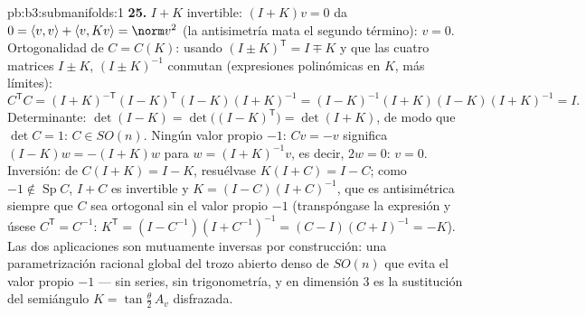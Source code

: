 \begin{solution}{pb:b3:submanifolds:1}
\textbf{25.} $I + K$ invertible: $(I + K)v = 0$ da $0 =
\langle v, v\rangle + \langle v, Kv\rangle = \norm v^2$ (la antisimetría
mata el segundo término): $v = 0$. Ortogonalidad de $C = C(K)$: usando
$(I \pm K)^{\mathsf T} = I \mp K$ y que las cuatro matrices $I \pm K$,
$(I \pm K)^{-1}$ conmutan (expresiones polinómicas en $K$, más límites):
\[
C^{\mathsf T}C = (I + K)^{-\mathsf T}(I - K)^{\mathsf T}
(I - K)(I + K)^{-1}
= (I - K)^{-1}(I + K)(I - K)(I + K)^{-1} = I .
\]
Determinante: $\det(I - K) = \det\bigl((I - K)^{\mathsf
T}\bigr) = \det(I + K)$, de modo que $\det C = 1$: $C \in SO(n)$. Ningún
valor propio $-1$: $Cv = -v$ significa $(I - K)w = -(I + K)w$ para
$w = (I + K)^{-1}v$, es decir, $2w = 0$: $v = 0$. Inversión: de
$C(I + K) = I - K$, resuélvase $K(I + C) = I -
C$; como $-1 \notin \operatorname{Sp}C$, $I + C$ es invertible y
$K = (I - C)(I + C)^{-1}$, que es antisimétrica siempre que $C$ sea
ortogonal sin el valor propio $-1$ (transpóngase la expresión y úsese
$C^{\mathsf T} =
C^{-1}$: $K^{\mathsf T} = (I - C^{-1})(I + C^{-1})^{-1} =
(C - I)(C + I)^{-1} = -K$). Las dos aplicaciones son mutuamente inversas
por construcción: una parametrización racional global del trozo abierto
denso de $SO(n)$ que evita el valor propio $-1$ --- sin series, sin
trigonometría, y en dimensión $3$ es la sustitución del semiángulo
$K = \tan\frac\theta2\,A_v$ disfrazada.
\end{solution}
